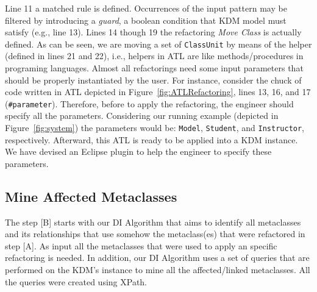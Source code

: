 
Line 11 a matched rule is defined. %
Occurrences of the input pattern may be filtered by introducing a \textit{guard}, a boolean condition that KDM model must satisfy (e.g., line 13). Lines 14 though 19 the refactoring \textit{Move Class} is actually defined. As can be seen, we are moving a set of \texttt{ClassUnit} by means of the helper (defined in lines 21 and 22), i.e., helpers in ATL are like methods/procedures in programing languages. 
Almost all refactorings need some input parameters that should be properly instantiated by the user. For instance, consider the chuck of code written in ATL depicted in Figure~\ref{fig:ATLRefactoring}, lines 13, 16, and 17 (\texttt{\#parameter}). Therefore, before to apply the refactoring, the engineer should specify all the parameters. Considering our running example (depicted in Figure~\ref{fig:system}) the parameters would be: \texttt{Model}, \texttt{Student}, and \texttt{Instructor}, respectively. Afterward, this ATL is ready to be applied into a KDM instance. We have devised an Eclipse plugin to help the engineer to specify these parameters.




\subsection{Mine Affected Metaclasses} %
\label{sub:mine_affected_metaclasses}

The step [B] starts with our DI Algorithm that aims to identify all metaclasses and its relationships that use somehow the metaclass(es) that were refactored in step [A]. As input all the metaclasses that were used to apply an specific refactoring is needed. In addition, our DI Algorithm uses a set of queries that are performed on the KDM's instance to mine all the affected/linked metaclasses. All the queries were created using XPath. %

